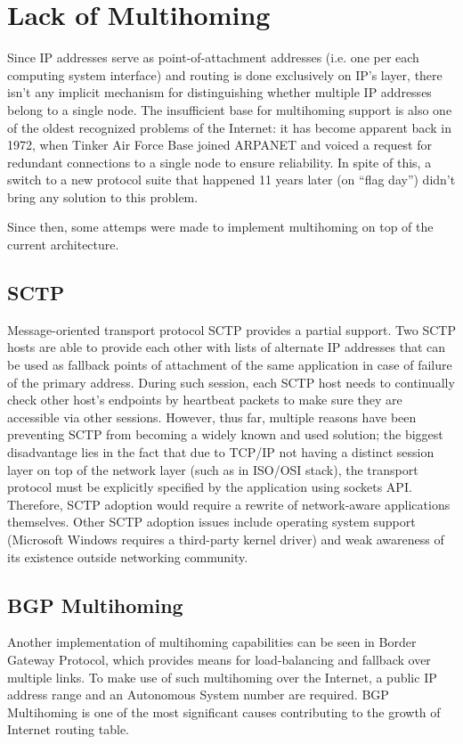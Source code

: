     \section{Lack of Multihoming}

        Since IP addresses serve as point-of-attachment addresses (i.e. one per each computing system interface) and routing is done exclusively on IP's layer, there isn't any implicit mechanism for distinguishing whether multiple IP addresses belong to a single node. The insufficient base for multihoming support is also one of the oldest recognized problems of the Internet: it has become apparent back in 1972, when Tinker Air Force Base joined ARPANET and voiced a request for redundant connections to a single node to ensure reliability. In spite of this, a switch to a new protocol suite that happened 11 years later (on ``flag day'') didn't bring any solution to this problem.

        Since then, some attemps were made to implement multihoming on top of the current architecture.

        \subsection{SCTP}
        Message-oriented transport protocol SCTP provides a partial support. Two SCTP hosts are able to provide each other with lists of alternate IP addresses that can be used as fallback points of attachment of the same application in case of failure of the primary address. During such session, each SCTP host needs to continually check other host's endpoints by heartbeat packets to make sure they are accessible via other sessions. However, thus far, multiple reasons have been preventing SCTP from becoming a widely known and used solution; the biggest disadvantage lies in the fact that due to TCP/IP not having a distinct session layer on top of the network layer (such as in ISO/OSI stack), the transport protocol must be explicitly specified by the application using sockets API. Therefore, SCTP adoption would require a rewrite of network-aware applications themselves. Other SCTP adoption issues include operating system support (Microsoft Windows requires a third-party kernel driver) and weak awareness of its existence outside networking community.

        \subsection{BGP Multihoming}
        Another implementation of multihoming capabilities can be seen in Border Gateway Protocol, which provides means for load-balancing and fallback over multiple links. To make use of such multihoming over the Internet, a public IP address range and an Autonomous System number are required. BGP Multihoming is one of the most significant causes contributing to the growth of Internet routing table.

